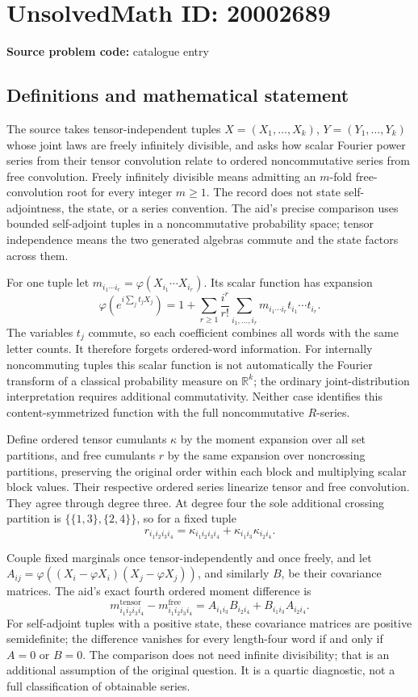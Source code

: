 \documentclass[11pt]{article}
\newcommand{\R}{\mathbb{R}}
\begin{document}
\section*{UnsolvedMath ID: 20002689}
\textbf{Source problem code:} catalogue entry
\subsection{Definitions and mathematical statement}
The source takes tensor-independent tuples \(X=(X_1,\ldots,X_k)\), \(Y=(Y_1,\ldots,Y_k)\) whose joint laws are freely infinitely divisible, and asks how scalar Fourier power series from their tensor convolution relate to ordered noncommutative series from free convolution. Freely infinitely divisible means admitting an \(m\)-fold free-convolution root for every integer \(m\ge1\). The record does not state self-adjointness, the state, or a series convention. The aid's precise comparison uses bounded self-adjoint tuples in a noncommutative probability space; tensor independence means the two generated algebras commute and the state factors across them.

For one tuple let \(m_{i_1\cdots i_r}=\varphi(X_{i_1}\cdots X_{i_r})\). Its scalar function has expansion
\[
 \varphi\left(e^{i\sum_jt_jX_j}\right)
 =1+\sum_{r\ge1}\frac{i^r}{r!}
 \sum_{i_1,\ldots,i_r}m_{i_1\cdots i_r}t_{i_1}\cdots t_{i_r}.
\]
The variables \(t_j\) commute, so each coefficient combines all words with the same letter counts. It therefore forgets ordered-word information. For internally noncommuting tuples this scalar function is not automatically the Fourier transform of a classical probability measure on \(\R^k\); the ordinary joint-distribution interpretation requires additional commutativity. Neither case identifies this content-symmetrized function with the full noncommutative \(R\)-series.

Define ordered tensor cumulants \(\kappa\) by the moment expansion over all set partitions, and free cumulants \(r\) by the same expansion over noncrossing partitions, preserving the original order within each block and multiplying scalar block values. Their respective ordered series linearize tensor and free convolution. They agree through degree three. At degree four the sole additional crossing partition is \(\{\{1,3\},\{2,4\}\}\), so for a fixed tuple
\[
 r_{i_1i_2i_3i_4}=\kappa_{i_1i_2i_3i_4}
 +\kappa_{i_1i_3}\kappa_{i_2i_4}.
\]

Couple fixed marginals once tensor-independently and once freely, and let \(A_{ij}=\varphi((X_i-\varphi X_i)(X_j-\varphi X_j))\), and similarly \(B\), be their covariance matrices. The aid's exact fourth ordered moment difference is
\[
 m^{\mathrm{tensor}}_{i_1i_2i_3i_4}
 -m^{\mathrm{free}}_{i_1i_2i_3i_4}
 =A_{i_1i_3}B_{i_2i_4}+B_{i_1i_3}A_{i_2i_4}.
\]
For self-adjoint tuples with a positive state, these covariance matrices are positive semidefinite; the difference vanishes for every length-four word if and only if \(A=0\) or \(B=0\). The comparison does not need infinite divisibility; that is an additional assumption of the original question. It is a quartic diagnostic, not a full classification of obtainable series.
\end{document}

